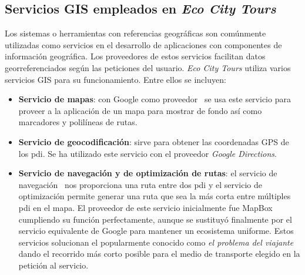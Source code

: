 	\subsection{Servicios GIS empleados en \textit{Eco City Tours}}
	Los sistemas o herramientas con referencias geográficas son comúnmente utilizadas como servicios en el desarrollo de aplicaciones con componentes de información geográfica. Los proveedores de estos servicios facilitan datos georreferenciados según las peticiones del usuario. \textit{Eco City Tours} utiliza varios servicios GIS para su funcionamiento. Entre ellos se incluyen:
	\begin{itemize}
		\item \textbf{Servicio de mapas}: con Google como proveedor~\cite{google_maps} se usa este servicio para proveer a la aplicación de un mapa para mostrar de fondo así como marcadores y polilíneas de rutas.

		\item \textbf{Servicio de geocodificación}: sirve para obtener las coordenadas GPS de los \acrlong{pdi}. Se ha utilizado este servicio con el proveedor \textit{Google Directions}.

		\item \textbf{Servicio de navegación y de optimización de rutas}: el servicio de navegación~\cite{mapbox_directions} nos proporciona una ruta entre dos \acrlong{pdi} y el servicio de optimización permite generar una ruta que sea la más corta entre múltiples \acrshort{pdi} en el mapa. El proveedor de este servicio inicialmente fue MapBox~\cite{mapbox_optimization} cumpliendo su función perfectamente, aunque se sustituyó finalmente por el servicio equivalente de Google para mantener un ecosistema uniforme. Estos servicios solucionan el popularmente conocido como \textit{el problema del viajante}~\cite{ubu_algoritmia} dando el recorrido más corto posible para el medio de transporte elegido en la petición al servicio.

	\end{itemize}

